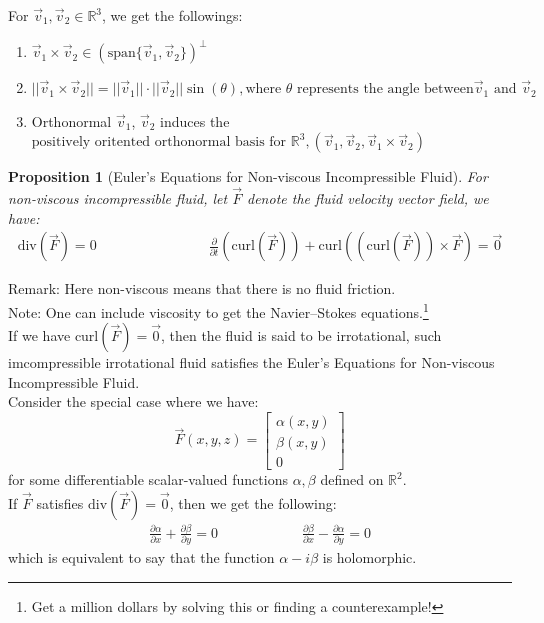 \documentclass[11pt,oneside]{book}
\theoremstyle{break}
\theoremstyle{break}
\newtheorem{prop}[lem]{Proposition}
\newcommand{\R}{\mathbb{R}}
\newcommand{\spa}{\text{span}}
\newcommand{\bmat}[1]{\begin{bmatrix} #1 \end{bmatrix}}
\newcommand{\note}{\color{red}Note: \color{black}}
\newcommand{\remark}{\color{blue}Remark: \color{black}}
\begin{document}
For $\vec{v}_1,\vec{v}_2 \in \R^3$, we get the followings:
\begin{enumerate}[topsep=3pt,itemsep=-1ex,partopsep=1ex,parsep=1ex]
\item $\vec{v}_1\times \vec{v}_2 \in (\spa\{ \vec{v}_1,\vec{v}_2\})^\perp$
\item $||\vec{v}_1\times \vec{v}_2|| = ||\vec{v}_1|| \cdot ||\vec{v}_2|| \sin(\theta), \text{where }\theta\text{ represents the angle between} \vec{v}_1\text{ and }\vec{v}_2$
\item Orthonormal $\vec{v}_1$, $\vec{v}_2$ induces the $\text{positively oritented orthonormal basis for }\R^3, (\vec{v}_1,\vec{v}_2, \vec{v}_1\times \vec{v}_2)$
\end{enumerate}



\begin{prop}[Euler's Equations for Non-viscous Incompressible Fluid]
For non-viscous incompressible fluid, let $\vec{F}$ denote the fluid velocity vector field, we have:
\begin{align*} 
\text{div}(\vec{F}) = 0 \qquad\qquad\qquad\qquad
\frac{\partial }{\partial t}\left(\text{curl}(\vec{F})\right) + \text{curl}\left(\left(\text{curl}(\vec{F})\right)\times \vec{F}\right) = \vec{0}
\end{align*}
\end{prop}
\remark Here non-viscous means that there is no fluid friction.\\
\note One can include viscosity to get the Navier–Stokes equations.\footnote{Get a million dollars by solving this or finding a counterexample!} \\

If we have $\text{curl}(\vec{F}) = \vec{0}$, then the fluid is said to be irrotational, such imcompressible irrotational fluid satisfies the Euler's Equations for Non-viscous Incompressible Fluid.\\

Consider the special case where we have: 
$$\vec{F}(x,y,z) = \bmat{\alpha(x,y)\\ \beta(x,y) \\ 0}$$ 
for some differentiable scalar-valued functions $\alpha,\beta$ defined on $\R^2$. \\If $\vec{F}$ satisfies $\text{div}(\vec{F}) = \vec{0}$, then we get the following:
\begin{align*}
\frac{\partial \alpha}{\partial x} + \frac{\partial \beta}{\partial y} = 0 \qquad\qquad\qquad
\frac{\partial \beta}{\partial x} - \frac{\partial \alpha}{\partial y} = 0
\end{align*} 
which is equivalent to say that the function $\alpha - i\beta$ is holomorphic. \\
\end{document}
